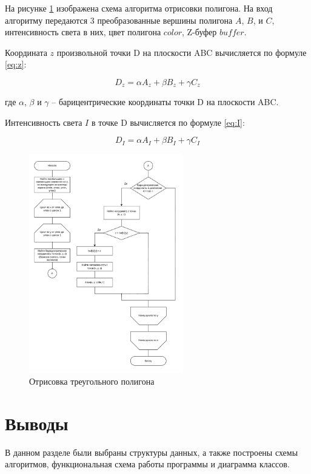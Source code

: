 На рисунке \ref{fig:z-buffer} изображена схема алгоритма отрисовки полигона. На вход алгоритму передаются 3 преобразованные вершины полигона $A$, $B$, и $C$, интенсивность света в них, цвет полигона $color$, Z-буфер $buffer$.

Координата $z$ произвольной точки D на плоскости ABC вычисляется по формуле \ref{eq:z}:

\begin{equation}
	\label{eq:z}
	D_z = \alpha A_z + \beta B_z + \gamma C_z
\end{equation}

\noindent где $\alpha$, $\beta$ и $\gamma$ -- барицентрические координаты точки D на плоскости ABC.

Интенсивность света $I$ в точке D вычисляется по формуле \ref{eq:I}:

\begin{equation}
	\label{eq:I}
	D_I = \alpha A_I + \beta B_I + \gamma C_I
\end{equation}

\begin{figure}[h!]
	\centering
	\includegraphics[width=0.6\textwidth]{tex_parts/z-buffer.pdf}
	\caption{\label{fig:z-buffer}Отрисовка треугольного полигона}
\end{figure}

\section{Выводы}

В данном разделе были выбраны структуры данных, а также построены схемы алгоритмов, функциональная схема работы программы и диаграмма классов.

